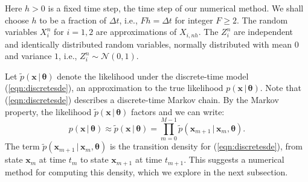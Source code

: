 \documentclass[graybox]{svmult}
\newcommand{\btheta}{\ensuremath{\boldsymbol{\theta}}}
\begin{document}
Here $h > 0$ is a fixed time step, the time step of our numerical method.  We shall choose $h$ to be a fraction of $\Delta t$, i.e., $F h = \Delta t$ for integer $F \geq 2$.  The random variables $X_i^n$ for $i=1,2$ are approximations of $X_{i,n h}$.  The $Z_i^n$ are independent and identically distributed random variables, normally distributed with mean $0$ and variance $1$, i.e., $Z_i^n \sim \mathcal{N}(0,1)$.

Let $\widetilde{p}(\mathbf{x} \, | \, \btheta)$ denote the likelihood under the discrete-time model (\ref{eqn:discretesde}), an approximation to the true likelihood $p(\mathbf{x} \, | \, \btheta)$.  Note that (\ref{eqn:discretesde}) describes a discrete-time Markov chain.  By the Markov property, the likelihood $\widetilde{p}(\mathbf{x} \, | \, \btheta)$ factors and we can write:
\begin{equation}
\label{eqn:markovfactor}
p(\mathbf{x} \, | \, \btheta) \approx \widetilde{p}(\mathbf{x} \, | \, \btheta) = \prod_{m=0}^{M-1} \widetilde{p}(\mathbf{x}_{m+1} \, | \, \mathbf{x}_m, \btheta).
\end{equation}
The term $\widetilde{p}(\mathbf{x}_{m+1} \, | \, \mathbf{x}_m, \btheta)$ is the transition density for (\ref{eqn:discretesde}), from state $\mathbf{x}_m$ at time $t_m$ to state $\mathbf{x}_{m+1}$ at time $t_{m+1}$.  This suggests a numerical method for computing this density, which we explore in the next subsection.
 
\end{document}
